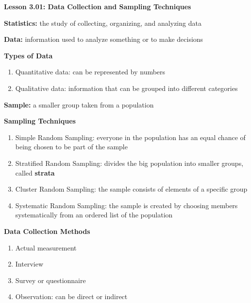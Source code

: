 \begin{center}
\textbf{Lesson 3.01: Data Collection and Sampling Techniques}
\end{center}

\vspace*{-1.5ex}

\noindent\textbf{Statistics:} the study of collecting, organizing, and analyzing data

\noindent\textbf{Data:} information used to analyze something or to make decisions

\noindent\textbf{Types of Data}
\begin{enumerate}[noitemsep, label = \color{blue}\arabic*. ]
\item Quantitative data: can be represented by numbers
\item Qualitative data: information that can be grouped into different categories
\end{enumerate}

\noindent\textbf{Sample:} a smaller group taken from a population

\noindent\textbf{Sampling Techniques}
\begin{enumerate}[noitemsep, label = \color{blue}\arabic*. ]
\item Simple Random Sampling: everyone in the population has an equal chance of being chosen to be part of the sample
\item Stratified Random Sampling: divides the big population into smaller groups, called \textbf{strata}
\item Cluster Random Sampling: the sample consists of elements of a specific group
\item Systematic Random Sampling: the sample is created by choosing members systematically from an ordered list of the population
\end{enumerate}

\noindent\textbf{Data Collection Methods}
\begin{enumerate}[noitemsep, label = \color{blue}\arabic*. ]
\item Actual measurement
\item Interview
\item Survey or questionnaire
\item Observation: can be direct or indirect
\end{enumerate}
